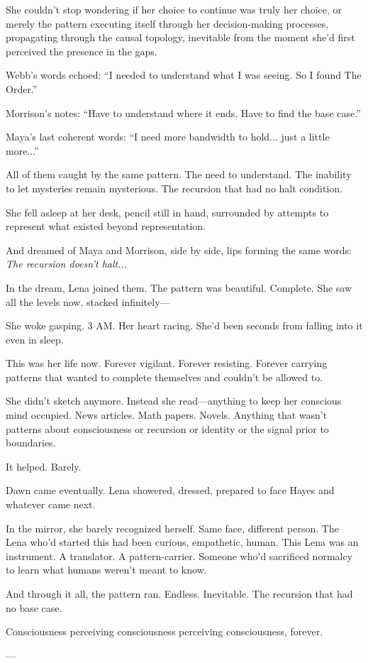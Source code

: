 She couldn't stop wondering if her choice to continue was truly her choice, or merely the pattern executing itself through her decision-making processes, propagating through the causal topology, inevitable from the moment she'd first perceived the presence in the gaps.

Webb's words echoed: ``I needed to understand what I was seeing. So I found The Order.''

Morrison's notes: ``Have to understand where it ends. Have to find the base case.''

Maya's last coherent words: ``I need more bandwidth to hold... just a little more...''

All of them caught by the same pattern. The need to understand. The inability to let mysteries remain mysterious. The recursion that had no halt condition.

She fell asleep at her desk, pencil still in hand, surrounded by attempts to represent what existed beyond representation.

And dreamed of Maya and Morrison, side by side, lips forming the same words: \textit{The recursion doesn't halt...}

In the dream, Lena joined them. The pattern was beautiful. Complete. She saw all the levels now, stacked infinitely---

She woke gasping. 3 AM. Her heart racing. She'd been seconds from falling into it even in sleep.

This was her life now. Forever vigilant. Forever resisting. Forever carrying patterns that wanted to complete themselves and couldn't be allowed to.

She didn't sketch anymore. Instead she read---anything to keep her conscious mind occupied. News articles. Math papers. Novels. Anything that wasn't patterns about consciousness or recursion or identity or the signal prior to boundaries.

It helped. Barely.

Dawn came eventually. Lena showered, dressed, prepared to face Hayes and whatever came next.

In the mirror, she barely recognized herself. Same face, different person. The Lena who'd started this had been curious, empathetic, human. This Lena was an instrument. A translator. A pattern-carrier. Someone who'd sacrificed normalcy to learn what humans weren't meant to know.

And through it all, the pattern ran. Endless. Inevitable. The recursion that had no base case.

Consciousness perceiving consciousness perceiving consciousness, forever.

---
